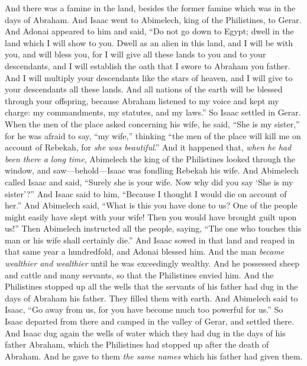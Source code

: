 \begin{biblechapter} %
 And there was a famine in the land, besides the former famine which was in the days of Abraham. And Isaac went to Abimelech, king of the Philistines, to Gerar.
\verse And Adonai appeared to him and said, “Do not go down to Egypt; dwell in the land which I will show to you.
\verse Dwell as an alien in this land, and I will be with you, and will bless you, for I will give all these lands to you and to your descendants, and I will establish the oath that I swore to Abraham you father.
\verse And I will multiply your descendants like the stars of heaven, and I will give to your descendants all these lands. And all nations of the earth will be blessed through your offspring,
\verse because Abraham listened to my voice and kept my charge: my commandments, my statutes, and my laws.”
\verse So Isaac settled in Gerar.
\verse When the men of the place asked concerning his wife, he said, “She is my sister,” for he was afraid to say, “my wife,” thinking “the men of the place will kill me on account of Rebekah, for \textit{she was beautiful}.”
\verse And it happened that, \textit{when he had been there a long time}, Abimelech the king of the Philistines looked through the window, and saw—behold—Isaac was fondling Rebekah his wife.
\verse And Abimelech called Isaac and said, “Surely she is your wife. Now why did you say ‘She is my sister’?” And Isaac said to him, “Because I thought I would die on account of her.”
\verse And Abimelech said, “What is this you have done to us? One of the people might easily have slept with your wife! Then you would have brought guilt upon us!”
\verse Then Abimelech instructed all the people, saying, “The one who touches this man or his wife shall certainly die.”
\verse And Isaac sowed in that land and reaped in that same year a hundredfold, and Adonai blessed him.
\verse And the man \textit{became wealthier and wealthier} until he was exceedingly wealthy.
\verse And he possessed sheep and cattle and many servants, so that the Philistines envied him.
\verse And the Philistines stopped up all the wells that the servants of his father had dug in the days of Abraham his father. They filled them with earth.
\verse And Abimelech said to Isaac, “Go away from us, for you have become much too powerful for us.”
\verse So Isaac departed from there and camped in the valley of Gerar, and settled there.
\verse And Isaac dug again the wells of water which they had dug in the days of his father Abraham, which the Philistines had stopped up after the death of Abraham. And he gave to them \textit{the same names} which his father had given them.

\end{biblechapter}

